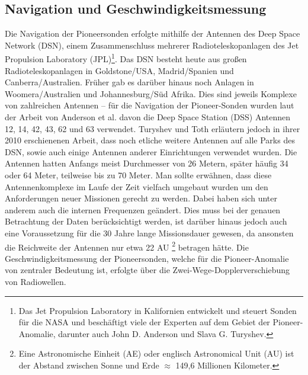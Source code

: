 
\subsection{Navigation und Geschwindigkeitsmessung}\label{messung}
Die Navigation der Pioneersonden erfolgte mithilfe der Antennen des Deep Space Network (DSN), einem Zusammenschluss mehrerer Radioteleskopanlagen des Jet Propulsion Laboratory (JPL)\footnote{Das Jet Propulsion Laboratory in Kalifornien entwickelt und steuert Sonden für die NASA und beschäftigt viele der Experten auf dem Gebiet der Pioneer-Anomalie, darunter auch John D. Anderson und Slava G. Turyshev.}. Das DSN besteht heute aus großen Radioteleskopanlagen in Goldstone/USA, Madrid/Spanien und Canberra/Australien. Früher gab es darüber hinaus noch Anlagen in Woomera/Australien und Johannesburg/Süd Afrika\cite{Anderson2002}\cite{Turyshev2010}. Dies sind jeweils Komplexe von zahlreichen Antennen – für die Navigation der Pioneer-Sonden wurden laut der Arbeit von Anderson et al.\cite{Anderson2002} davon die Deep Space Station (DSS) Antennen 12, 14, 42, 43, 62 und 63 verwendet. Turyshev und Toth erläutern jedoch in ihrer 2010 erschienenen Arbeit, dass noch etliche weitere Antennen auf alle Parks des DSN, sowie auch einige Antennen anderer Einrichtungen verwendet wurden.\cite{Turyshev2010} Die Antennen hatten Anfangs meist Durchmesser von 26 Metern, später häufig 34 oder 64 Meter, teilweise bis zu 70 Meter\cite{Turyshev2010}.
Man sollte erwähnen, dass diese Antennenkomplexe im Laufe der Zeit vielfach umgebaut wurden um den Anforderungen neuer Missionen gerecht zu werden. Dabei haben sich unter anderem auch die internen Frequenzen geändert\cite{Anderson2002}. Dies muss bei der genauen Betrachtung der Daten berücksichtigt werden, ist darüber hinaus jedoch auch eine Voraussetzung für die 30 Jahre lange Missionsdauer gewesen, da ansonsten die Reichweite der Antennen nur etwa 22 AU \footnote{Eine Astronomische Einheit (AE) oder englisch Astronomical Unit (AU) ist der Abstand zwischen Sonne und Erde $\approx$ 149,6 Millionen Kilometer.} betragen hätte.\cite{Turyshev2010}
Die Geschwindigkeitsmessung der Pioneersonden, welche für die Pioneer-Anomalie von zentraler Bedeutung ist, erfolgte über die Zwei-Wege-Dopplerverschiebung von Radiowellen.

